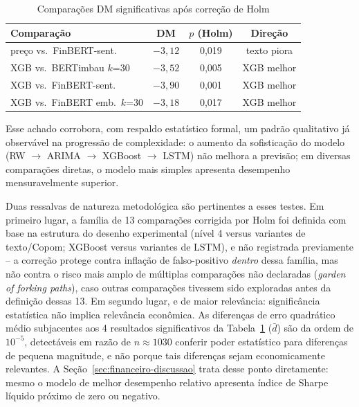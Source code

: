 \documentclass[conference]{IEEEtran}
\begin{document}
\begin{table}[htbp]
\caption{Compara\c{c}\~oes DM significativas ap\'os corre\c{c}\~ao de Holm}
\begin{center}
\begin{tabular}{lccc}
\toprule
\textbf{Compara\c{c}\~ao} & \textbf{DM} & \textbf{$p$ (Holm)} & \textbf{Dire\c{c}\~ao} \\
\midrule
pre\c{c}o vs.\ FinBERT-sent.     & $-3{,}12$ & 0,019 & texto piora \\
XGB vs.\ BERTimbau $k$=30    & $-3{,}52$ & 0,005 & XGB melhor \\
XGB vs.\ FinBERT-sent.       & $-3{,}90$ & 0,001 & XGB melhor \\
XGB vs.\ FinBERT emb.\ $k$=30 & $-3{,}18$ & 0,017 & XGB melhor \\
\bottomrule
\end{tabular}
\label{tab:dm}
\end{center}
\end{table}

Esse achado corrobora, com respaldo estat\'istico formal, um padr\~ao qualitativo j\'a observ\'avel na progress\~ao de complexidade: o aumento da sofistica\c{c}\~ao do modelo (RW $\to$ ARIMA $\to$ XGBoost $\to$ LSTM) n\~ao melhora a previs\~ao; em diversas compara\c{c}\~oes diretas, o modelo mais simples apresenta desempenho mensuravelmente superior.

Duas ressalvas de natureza metodol\'ogica s\~ao pertinentes a esses testes. Em primeiro lugar, a fam\'ilia de 13 compara\c{c}\~oes corrigida por Holm foi definida com base na estrutura do desenho experimental (n\'ivel 4 versus variantes de texto/Copom; XGBoost versus variantes de LSTM), e n\~ao registrada previamente -- a corre\c{c}\~ao protege contra infla\c{c}\~ao de falso-positivo \emph{dentro} dessa fam\'ilia, mas n\~ao contra o risco mais amplo de m\'ultiplas compara\c{c}\~oes n\~ao declaradas (\emph{garden of forking paths}), caso outras compara\c{c}\~oes tivessem sido exploradas antes da defini\c{c}\~ao dessas 13. Em segundo lugar, e de maior relev\^ancia: signific\^ancia estat\'istica n\~ao implica relev\^ancia econ\^omica. As diferen\c{c}as de erro quadr\'atico m\'edio subjacentes aos 4 resultados significativos da Tabela~\ref{tab:dm} ($\bar d$) s\~ao da ordem de $10^{-5}$, detect\'aveis em raz\~ao de $n\approx1030$ conferir poder estat\'istico para diferen\c{c}as de pequena magnitude, e n\~ao porque tais diferen\c{c}as sejam economicamente relevantes. A Se\c{c}\~ao~\ref{sec:financeiro-discussao} trata desse ponto diretamente: mesmo o modelo de melhor desempenho relativo apresenta \'indice de Sharpe l\'iquido pr\'oximo de zero ou negativo.
\end{document}
